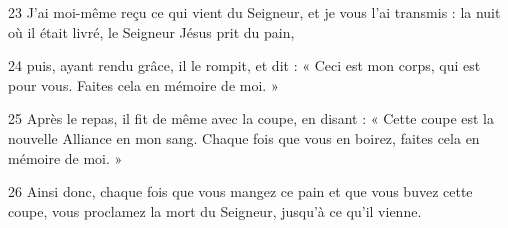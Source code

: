 
23 J’ai moi-même reçu ce qui vient du Seigneur, et je vous l’ai transmis : la nuit où il était livré, le Seigneur Jésus prit du pain,

24 puis, ayant rendu grâce, il le rompit, et dit : « Ceci est mon corps, qui est pour vous. Faites cela en mémoire de moi. »

25 Après le repas, il fit de même avec la coupe, en disant : « Cette coupe est la nouvelle Alliance en mon sang. Chaque fois que vous en boirez, faites cela en mémoire de moi. »

26 Ainsi donc, chaque fois que vous mangez ce pain et que vous buvez cette coupe, vous proclamez la mort du Seigneur, jusqu’à ce qu’il vienne.
